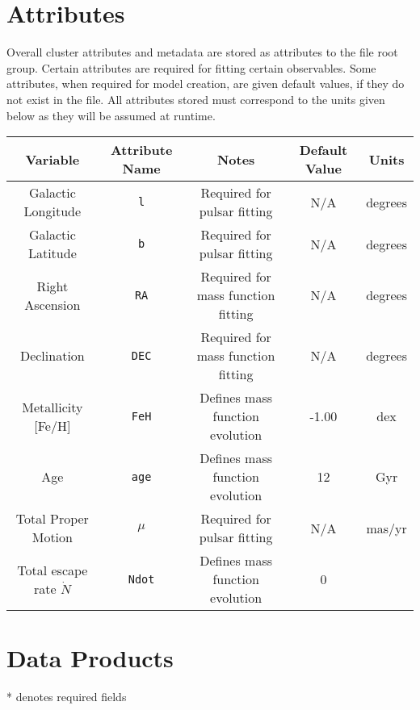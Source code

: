 \documentclass[12pt]{article}
\begin{document}
\section{Attributes}

Overall cluster attributes and metadata are stored as attributes to the
file root group. Certain attributes are required for fitting certain
observables. Some attributes, when required for model creation, are given
default values, if they do not exist in the file. All attributes stored must
correspond to the units given below as they will be assumed at runtime.

\begin{center}
\begin{table}[H]
\begin{tabular}{ | c | c | c | c | c | }
    \hline
    Variable & Attribute Name & Notes & Default Value & Units \\
    \hline\hline
    Galactic Longitude & \texttt{l} &
    Required for pulsar fitting & N/A & degrees \\
    \hline
    Galactic Latitude & \texttt{b}  &
    Required for pulsar fitting & N/A & degrees \\
    \hline
    Right Ascension & \texttt{RA} &
    Required for mass function fitting & N/A & degrees \\
    \hline
    Declination & \texttt{DEC}  &
    Required for mass function fitting & N/A & degrees \\
    \hline
    Metallicity [Fe/H] & \texttt{FeH} &
    Defines mass function evolution & -1.00 & dex \\
    \hline
    Age & \texttt{age} & Defines mass function evolution & 12 & Gyr \\
    \hline
    Total Proper Motion & \texttt{\(\mu\)} &
    Required for pulsar fitting & N/A & mas/yr \\
    \hline
    Total escape rate \(\dot{N}\) & \texttt{Ndot} &
    Defines mass function evolution & 0 & \\
    \hline
\end{tabular}
\end{table}
\end{center}

\newpage



\newpage
\section{Data Products}

* denotes required fields










\end{document}
